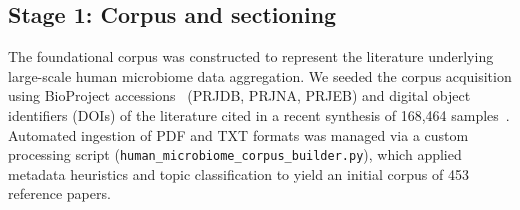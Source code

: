 \documentclass[referee,lineno,pdflatex,sn-vancouver-num]{sn-jnl}
\theoremstyle{thmstyleone}%
\theoremstyle{thmstyletwo}%
\theoremstyle{thmstylethree}%
\begin{document}
\subsection{Stage 1: Corpus and sectioning}\label{sec:stage1}

The foundational corpus was constructed to represent the literature
underlying large-scale human microbiome data aggregation. We seeded the
corpus acquisition using BioProject accessions~\cite{barrett2012bioproject}
(PRJDB, PRJNA, PRJEB) and digital object identifiers (DOIs) of the
literature cited in a recent synthesis of 168,464 samples~\cite{abdill2025}.
Automated ingestion of PDF and TXT formats was managed via a custom
processing script (\texttt{human\_microbiome\_corpus\_builder.py}), which
applied metadata heuristics and topic classification to yield an initial
corpus of 453 reference papers.
\end{document}
